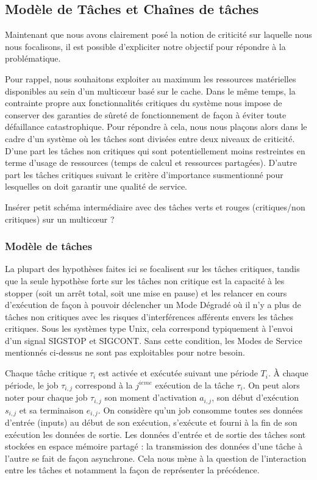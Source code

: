 \documentclass[french, a4paper, 11pt, twoside, pdftex]{StyleThese}
\begin{document}
    \subsection{Modèle de Tâches et Chaînes de tâches}
    	Maintenant que nous avons clairement posé la notion de criticité sur laquelle nous nous focalisons, il est possible d'expliciter notre objectif pour répondre à la problématique.
    	
    	Pour rappel, nous souhaitons exploiter au maximum les ressources matérielles disponibles au sein d'un multicœur basé sur le cache.
    	Dans le même temps, la contrainte propre aux fonctionnalités critiques du système nous impose de conserver des garanties de sûreté de fonctionnement de façon à éviter toute défaillance catastrophique.
    	Pour répondre à cela, nous nous plaçons alors dans le cadre d'un système où les tâches sont divisées entre deux niveaux de criticité. D'une part les tâches non critiques qui sont potentiellement moins restreintes en terme d'usage de ressources (temps de calcul et ressources partagées).  D'autre part les tâches critiques suivant le critère d'importance susmentionné pour lesquelles on doit garantir une qualité de service. 
    	
    	\alert{Insérer petit schéma intermédiaire avec des tâches verts et rouges (critiques/non critiques) sur un multicœur ?}
    	
    	\subsubsection{Modèle de tâches}
		La plupart des hypothèses faites ici se focalisent sur les tâches critiques, tandis que la seule hypothèse forte sur les tâches non critique est la capacité à les stopper (soit un arrêt total, soit une mise en pause) et les relancer en cours d'exécution de façon à pouvoir déclencher un Mode Dégradé où il n'y a plus de tâches non critiques avec les risques d'interférences afférents envers les tâches critiques. Sous les systèmes type Unix, cela correspond typiquement à l'envoi d'un signal SIGSTOP et SIGCONT. Sans cette condition, les Modes de Service mentionnés ci-dessus ne sont pas exploitables pour notre besoin. 
		
		Chaque tâche critique $\tau_i$ est activée et exécutée suivant une période $T_i$. 
		À chaque période, le job $\tau_{i,j}$ correspond à la $j^{ieme}$ exécution de la tâche $\tau_i$. 
		On peut alors noter pour chaque job $\tau_{i,j}$ son moment d'activation $a_{i,j}$, son début d'exécution $s_{i,j}$ et sa terminaison $e_{i,j}$. 
		On considère qu'un job consomme toutes ses données d'entrée (inputs) au début de son exécution, s'exécute et fourni à la fin de son exécution les données de sortie. Les données d'entrée et de sortie des tâches sont stockées en espace mémoire partagé : la transmission des données d'une tâche à l'autre se fait de façon asynchrone.
		Cela nous mène à la question de l'interaction entre les tâches et notamment la façon de représenter la précédence.
		
\end{document}
